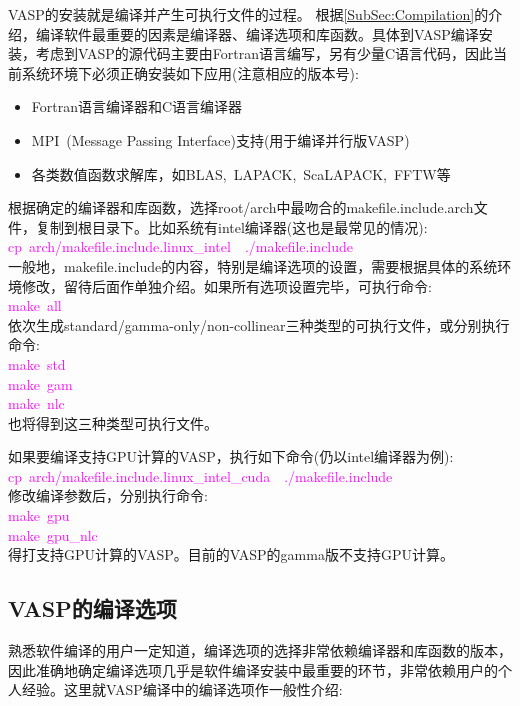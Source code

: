 \textrm{VASP}的安装就是编译并产生可执行文件的过程。
根据\ref{SubSec:Compilation}的介绍，编译软件最重要的因素是编译器、编译选项和库函数。具体到\textrm{VASP}编译安装，考虑到\textrm{VASP}的源代码主要由\textrm{Fortran}语言编写，另有少量\textrm{C}语言代码，因此当前系统环境下必须正确安装如下应用(注意相应的版本号):~
\begin{itemize}
	\item \textrm{Fortran}语言编译器和\textrm{C}语言编译器
	\item \textrm{MPI~(Message Passing Interface)}支持(用于编译并行版\textrm{VASP})
	\item 各类数值函数求解库，如\textrm{BLAS},~\textrm{LAPACK},~\textrm{ScaLAPACK},~\textrm{FFTW}等
\end{itemize}
根据确定的编译器和库函数，选择\textrm{root/arch}中最吻合的\textrm{makefile.include.arch}文件，复制到根目录下。比如系统有\textrm{intel}编译器(这也是最常见的情况):~\\
\textcolor{magenta}{\textrm{cp~arch/makefile.include.linux\_intel~~./makefile.include}}\\
一般地，\textrm{makefile.include}的内容，特别是编译选项的设置，需要根据具体的系统环境修改，留待后面作单独介绍。如果所有选项设置完毕，可执行命令:\\
\textcolor{magenta}{\textrm{make~all}}\\
依次生成\textrm{standard}/\textrm{gamma-only}/\textrm{non-collinear}三种类型的可执行文件，或分别执行命令:\\
\textcolor{magenta}{\textrm{make~std}}\\
\textcolor{magenta}{\textrm{make~gam}}\\
\textcolor{magenta}{\textrm{make~nlc}}\\
也将得到这三种类型可执行文件。

如果要编译支持\textrm{GPU}计算的\textrm{VASP}，执行如下命令(仍以\textrm{intel}编译器为例):\\
\textcolor{magenta}{\textrm{cp~arch/makefile.include.linux\_intel\_cuda~~./makefile.include}}\\
修改编译参数后，分别执行命令:\\
\textcolor{magenta}{\textrm{make~gpu}}\\
\textcolor{magenta}{\textrm{make~gpu\_nlc}}\\
得打支持\textrm{GPU}计算的\textrm{VASP}。目前的\textrm{VASP}的\textrm{gamma}版不支持\textrm{GPU}计算。

\subsection{VASP的编译选项}
熟悉软件编译的用户一定知道，编译选项的选择非常依赖编译器和库函数的版本，因此准确地确定编译选项几乎是软件编译安装中最重要的环节，非常依赖用户的个人经验。这里就\textrm{VASP}编译中的编译选项作一般性介绍:~
